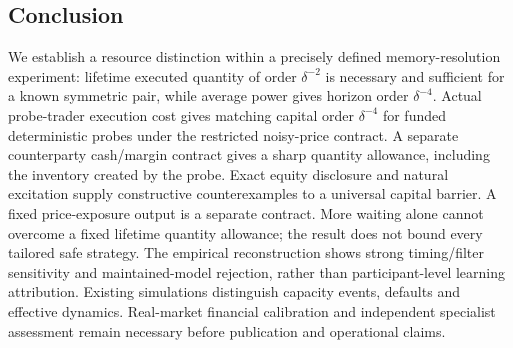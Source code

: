 \documentclass[12pt]{article}
\theoremstyle{definition}
\theoremstyle{remark}
\begin{document}
\subsection{Conclusion}
We establish a resource distinction within a precisely defined memory-resolution experiment: lifetime executed quantity of order $\delta^{-2}$ is necessary and sufficient for a known symmetric pair, while average power gives horizon order $\delta^{-4}$. Actual probe-trader execution cost gives matching capital order $\delta^{-4}$ for funded deterministic probes under the restricted noisy-price contract. A separate counterparty cash/margin contract gives a sharp quantity allowance, including the inventory created by the probe. Exact equity disclosure and natural excitation supply constructive counterexamples to a universal capital barrier. A fixed price-exposure output is a separate contract. More waiting alone cannot overcome a fixed lifetime quantity allowance; the result does not bound every tailored safe strategy. The empirical reconstruction shows strong timing/filter sensitivity and maintained-model rejection, rather than participant-level learning attribution. Existing simulations distinguish capacity events, defaults and effective dynamics. Real-market financial calibration and independent specialist assessment remain necessary before publication and operational claims.
\end{document}
